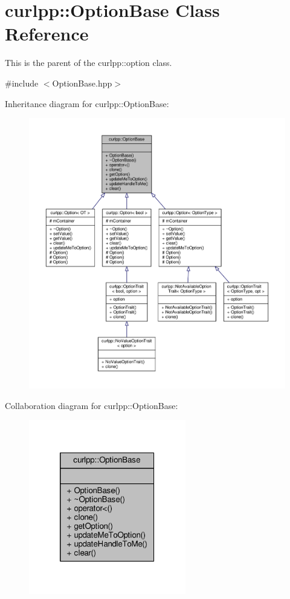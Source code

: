 \hypertarget{classcurlpp_1_1OptionBase}{\section{curlpp\-:\-:Option\-Base Class Reference}
\label{classcurlpp_1_1OptionBase}
}


This is the parent of the curlpp\-::option class.  




{\ttfamily \#include $<$Option\-Base.\-hpp$>$}



Inheritance diagram for curlpp\-:\-:Option\-Base\-:\nopagebreak
\begin{figure}[H]
\begin{center}
\leavevmode
\includegraphics[width=350pt]{classcurlpp_1_1OptionBase__inherit__graph}
\end{center}
\end{figure}


Collaboration diagram for curlpp\-:\-:Option\-Base\-:\nopagebreak
\begin{figure}[H]
\begin{center}
\leavevmode
\includegraphics[width=194pt]{classcurlpp_1_1OptionBase__coll__graph}
\end{center}
\end{figure}
